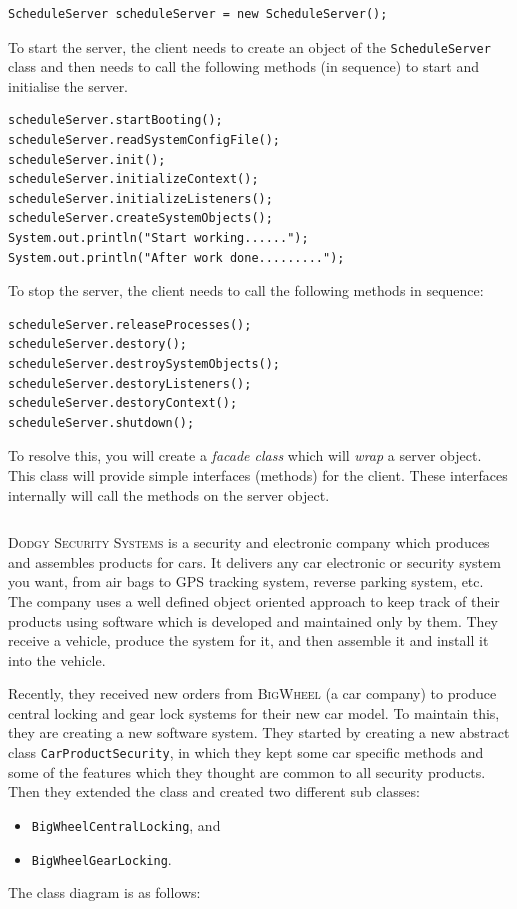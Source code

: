 \documentclass[12pt,a4paper]{exam}
\newcommand{\code}{/Users/keith/Documents/Courses/sdp/repo/worksheets/dp-two/kotlin/src}
\begin{document}
\begin{questions}
\begin{verbatim}
ScheduleServer scheduleServer = new ScheduleServer();	
\end{verbatim}
To start the server, the client needs to create an object of the 
\texttt{ScheduleServer} class and then needs to call the following methods (in 
sequence) to start and initialise the server.
\begin{verbatim}
scheduleServer.startBooting();
scheduleServer.readSystemConfigFile();
scheduleServer.init();
scheduleServer.initializeContext();
scheduleServer.initializeListeners();
scheduleServer.createSystemObjects();
System.out.println("Start working......");
System.out.println("After work done.........");	
\end{verbatim}
To stop the server, the client needs to call the following methods in sequence:
\begin{verbatim}
scheduleServer.releaseProcesses();
scheduleServer.destory();
scheduleServer.destroySystemObjects();
scheduleServer.destoryListeners();
scheduleServer.destoryContext();
scheduleServer.shutdown();	
\end{verbatim}
To resolve this, you will create a \emph{facade class} which will \emph{wrap} a server object. 
This class will provide simple interfaces (methods) for the client. 
These interfaces internally will call the methods on the server object. 

\inputminted{scala}{\code/facadepattern/ScheduleServer.kt}



\question %
\textsc{Dodgy Security Systems} is a security and electronic company which produces and 
assembles products for cars. It delivers any car electronic or security system you want, 
from air bags to GPS tracking system, reverse parking system, etc. 
The company uses a well defined object oriented approach to keep track of their products 
using software which is developed and maintained only by them. 
They receive a vehicle, produce the system for it, and then assemble it and install it into 
the vehicle.

Recently, they received new orders from \textsc{BigWheel} (a car company) to produce 
central locking and gear lock systems for their new car model. To maintain this, they are 
creating a new software system. They started by creating a new abstract class 
\verb!CarProductSecurity!, in which they kept some car specific methods and some of the 
features which they thought are common to all security products. 
Then they extended the class and created two different sub classes:
\begin{itemize}
\item \verb!BigWheelCentralLocking!, and 
\item \verb!BigWheelGearLocking!. 
\end{itemize}
The class diagram is as follows:


\end{questions}
\end{document}
